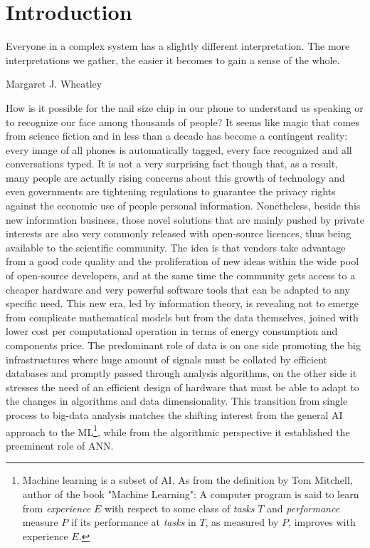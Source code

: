 \chapter{Introduction}

\epigraph{Everyone in a complex system has a slightly different interpretation. The more interpretations we gather, the easier it becomes to gain a sense of the whole.}{Margaret J. Wheatley}


How is it possible for the nail size chip in our phone to understand us speaking or to recognize our face among thousands of people? 
It seems like magic that comes from science fiction and in less than a decade has become a contingent reality: every image of all phones is automatically tagged, every face recognized and all conversations typed.
It is not a very surprising fact though that, as a result, many people are actually rising concerns about this growth of technology and even governments are tightening regulations to guarantee the privacy rights against the economic use of people personal information.
%
Nonetheless, beside this new information business, those novel solutions that are mainly pushed by private interests are also very commonly released with open-source licences, thus being available to the scientific community. The idea is that vendors take advantage from a good code quality and the proliferation of new ideas within the wide pool of open-source developers, and at the same time the community gets access to a cheaper hardware and very powerful software tools that can be adapted to any specific need.
%
This new era, led by information theory, is revealing not to emerge from complicate mathematical models but from the data themselves, joined with lower cost per computational operation in terms of energy consumption and components price. %
The predominant role of data is on one side promoting the big infrastructures where huge amount of signals must be collated by efficient databases and promptly passed through analysis algorithms, on the other side it stresses the need of an efficient design of hardware that must be able to adapt to the changes in algorithms and data dimensionality. This transition from single process to big-data analysis matches the shifting interest from the general \ac{AI} approach to the \ac{ML}\footnote{Machine learning is a subset of \acs{AI}. As from the definition by Tom Mitchell, author of the book "Machine Learning": A computer program is said to learn from \textit{experience} $E$ with respect to some class of \textit{tasks} $T$ and \textit{performance} measure $P$ if its performance at \textit{tasks} in $T$, as measured by $P$, improves with experience $E$.}, while from the algorithmic perspective it established the preeminent role of \ac{ANN}.

